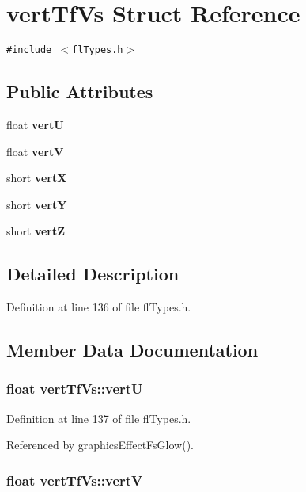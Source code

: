 \section{vert\-Tf\-Vs Struct Reference}
\label{structvertTfVs}
{\tt \#include $<$fl\-Types.h$>$}

\subsection*{Public Attributes}
\begin{CompactItemize}
\item 
float {\bf vert\-U}
\item 
float {\bf vert\-V}
\item 
short {\bf vert\-X}
\item 
short {\bf vert\-Y}
\item 
short {\bf vert\-Z}
\end{CompactItemize}


\subsection{Detailed Description}




Definition at line 136 of file fl\-Types.h.

\subsection{Member Data Documentation}
\subsubsection{\setlength{\rightskip}{0pt plus 5cm}float {\bf vert\-Tf\-Vs::vert\-U}}\label{structvertTfVs_4986fe018d3a30a2bcbfbd25ca97cb79}




Definition at line 137 of file fl\-Types.h.

Referenced by graphics\-Effect\-Fs\-Glow().
\subsubsection{\setlength{\rightskip}{0pt plus 5cm}float {\bf vert\-Tf\-Vs::vert\-V}}\label{structvertTfVs_bac65580a452faa36da136446737203a}





